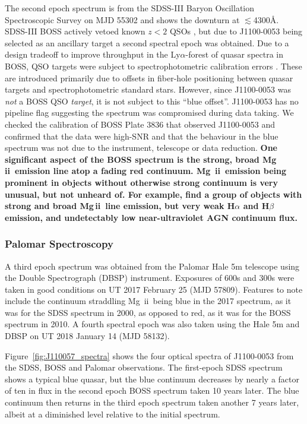 \documentclass[a4paper,fleqn,usenatbib]{mnras}
\begin{document}
The second epoch spectrum is from the SDSS-III Baryon Oscillation
Spectroscopic Survey \citep[BOSS; ][]{Dawson2013} on MJD 55302 and shows the
downturn at $\lesssim$4300\AA. SDSS-III BOSS actively vetoed known
$z<2$ QSOs \citep{Ross2012}, but due to J1100-0053 being selected as
an ancillary target \citep[via a white dwarf program;][]{Kepler2015,
Kepler2016} a second spectral epoch was obtained. Due to a design
tradeoff to improve throughput in the Ly$\alpha$-forest of quasar
spectra in BOSS, QSO targets were subject to spectrophotometric
calibration errors \citep{Margala2016}. These are introduced primarily
due to offsets in fiber-hole positioning between quasar targets and
spectrophotometric standard stars. However, since J1100-0053 was {\it
not} a BOSS QSO {\it target}, it is not subject to this ``blue
offset''. J1100-0053 has no pipeline flag suggesting the spectrum was
compromised during data taking. We checked the calibration of BOSS
Plate 3836 that observed J1100-0053 and confirmed that the data were
high-SNR and that the behaviour in the blue spectrum was not due to
the instrument, telescope or data reduction.
{\bf One significant aspect of the BOSS spectrum is the strong, broad
Mg\,{\sc ii}\ emission line atop a fading red continuum.  Mg\,{\sc
ii}\ emission being prominent in objects without otherwise strong
continuum is very unusual, but not unheard of.  For example,
\citet{Roig2014} find a group of objects with strong and broad
Mg\,{\sc ii}\ line emission, but very weak H$\alpha$ and H$\beta$
emission, and undetectably low near-ultraviolet AGN continuum flux.}

\subsubsection{Palomar Spectroscopy} 
A third epoch spectrum was obtained from the Palomar Hale 5m telescope
using the Double Spectrograph (DBSP) instrument.  Exposures of 600s
and 300s were taken in good conditions on UT 2017 February 25 (MJD
57809). Features to note include the continuum straddling Mg\,{\sc
ii}\ being blue in the 2017 spectrum, as it was for the SDSS spectrum
in 2000, as opposed to red, as it was for the BOSS spectrum in 2010. A
fourth spectral epoch was also taken using the Hale 5m and DBSP on
UT 2018 January 14 (MJD 58132). 

Figure~\ref{fig:J110057_spectra} shows the four optical spectra of
J1100-0053 from the SDSS, BOSS and Palomar observations.  The first-epoch
SDSS spectrum shows a typical blue quasar, but the blue continuum
decreases by nearly a factor of ten in flux in the second epoch BOSS
spectrum taken 10 years later. The blue continuum then returns in the
third epoch spectrum taken another 7 years later, albeit at a
diminished level relative to the initial spectrum. 
\end{document}
